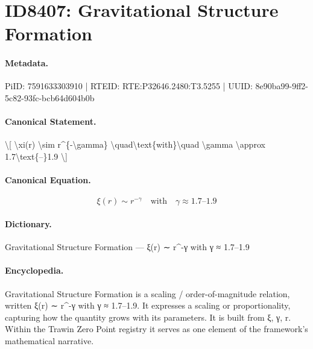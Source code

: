 \section*{ID8407: Gravitational Structure Formation}
\paragraph{Metadata.}
PiID: 7591633303910 | RTEID: RTE:P32646.2480:T3.5255 | UUID: 8e90ba99-9ff2-5c82-93fc-bcb64d604b0b

\paragraph{Canonical Statement.}
\textbackslash{}[ \textbackslash{}xi(r) \textbackslash{}sim r\textasciicircum{}\{-\textbackslash{}gamma\} \textbackslash{}quad\textbackslash{}text\{with\}\textbackslash{}quad \textbackslash{}gamma \textbackslash{}approx 1.7\textbackslash{}text\{–\}1.9 \textbackslash{}]

\paragraph{Canonical Equation.}
\[
\xi(r) \sim r^{-\gamma} \quad\text{with}\quad \gamma \approx 1.7\text{–}1.9
\]

\paragraph{Dictionary.}
Gravitational Structure Formation — ξ(r) ∼ r\textasciicircum{}-γ with γ ≈ 1.7–1.9

\paragraph{Encyclopedia.}
Gravitational Structure Formation is a scaling / order-of-magnitude relation, written ξ(r) ∼ r\textasciicircum{}-γ with γ ≈ 1.7–1.9. It expresses a scaling or proportionality, capturing how the quantity grows with its parameters. It is built from ξ, γ, r. Within the Trawin Zero Point registry it serves as one element of the framework's mathematical narrative.
